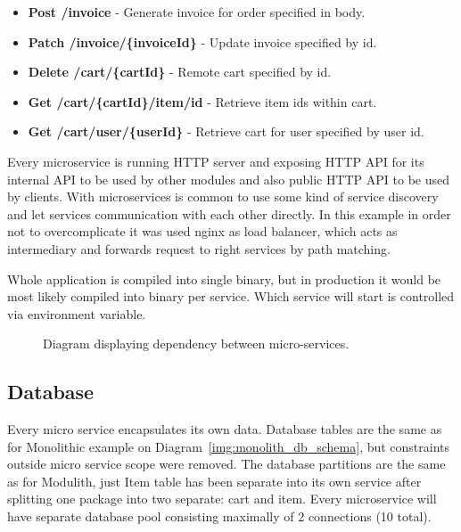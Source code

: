 \begin{itemize}
    \item \textbf{Post /invoice} - Generate invoice for order specified in body.
    \item \textbf{Patch /invoice/\{invoiceId\}} - Update invoice specified by id.
    \item \textbf{Delete /cart/\{cartId\}} - Remote cart specified by id.
    \item \textbf{Get /cart/\{cartId\}/item/id} - Retrieve item ids within cart.
    \item \textbf{Get /cart/user/\{userId\}} - Retrieve cart for user specified by user id.
\end{itemize}

Every microservice is running HTTP server and exposing HTTP API for its internal API to be used by other modules and also public HTTP API to be used by clients. With microservices is common to use some kind of service discovery and let services communication with each other directly. In this example in order not to overcomplicate it was used nginx as load balancer, which acts as intermediary and forwards request to right services by path matching.

Whole application is compiled into single binary, but in production it would be most likely compiled into binary per service. Which service will start is controlled via environment variable.

\begin{figure}
    \centering
    
    \caption{Diagram displaying dependency between micro-services. \label{img:microservices_dependency}}
\end{figure}

\subsection{Database}
Every micro service encapsulates its own data. Database tables are the same as for Monolithic example on Diagram~\ref{img:monolith_db_schema}, but constraints outside micro service scope were removed. The database partitions are the same as for Modulith, just Item table has been separate into its own service after splitting one package into two separate: cart and item. Every microservice will have separate database pool consisting maximally of 2 connections (10 total).



